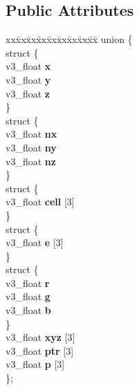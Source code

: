 \subsection*{Public Attributes}
\begin{DoxyCompactItemize}
\item 
\begin{tabbing}
xx\=xx\=xx\=xx\=xx\=xx\=xx\=xx\=xx\=\kill
union \{\\
\>struct \{\\
\>\>v3\_float {\bfseries x}\\
\>\>v3\_float {\bfseries y}\\
\>\>v3\_float {\bfseries z}\\
\>\} \hypertarget{unionns__phys_1_1vector3_1_1_0D0_a8c775ee432466199d998da6c2b31a535}{}\label{unionns__phys_1_1vector3_1_1_0D0_a8c775ee432466199d998da6c2b31a535}
\\
\>struct \{\\
\>\>v3\_float {\bfseries nx}\\
\>\>v3\_float {\bfseries ny}\\
\>\>v3\_float {\bfseries nz}\\
\>\} \hypertarget{unionns__phys_1_1vector3_1_1_0D0_a7e015f7b9566397ade14f5f26af0fdf3}{}\label{unionns__phys_1_1vector3_1_1_0D0_a7e015f7b9566397ade14f5f26af0fdf3}
\\
\>struct \{\\
\>\>v3\_float {\bfseries cell} \mbox{[}3\mbox{]}\\
\>\} \hypertarget{unionns__phys_1_1vector3_1_1_0D0_a36fe0fe4aabc4c4279909d2c72a2977f}{}\label{unionns__phys_1_1vector3_1_1_0D0_a36fe0fe4aabc4c4279909d2c72a2977f}
\\
\>struct \{\\
\>\>v3\_float {\bfseries e} \mbox{[}3\mbox{]}\\
\>\} \hypertarget{unionns__phys_1_1vector3_1_1_0D0_ac22925e2c74a399ef5ca77d625a524ba}{}\label{unionns__phys_1_1vector3_1_1_0D0_ac22925e2c74a399ef5ca77d625a524ba}
\\
\>struct \{\\
\>\>v3\_float {\bfseries r}\\
\>\>v3\_float {\bfseries g}\\
\>\>v3\_float {\bfseries b}\\
\>\} \hypertarget{unionns__phys_1_1vector3_1_1_0D0_ad3b0ce32192493da1ec6c21b34b3c1d6}{}\label{unionns__phys_1_1vector3_1_1_0D0_ad3b0ce32192493da1ec6c21b34b3c1d6}
\\
\>v3\_float {\bfseries xyz} \mbox{[}3\mbox{]}\\
\>v3\_float {\bfseries ptr} \mbox{[}3\mbox{]}\\
\>v3\_float {\bfseries p} \mbox{[}3\mbox{]}\\
\}; \hypertarget{classns__phys_1_1vector3_a83ac2c74246a94c5bd77a35d82881b23}{}\label{classns__phys_1_1vector3_a83ac2c74246a94c5bd77a35d82881b23}
\\

\end{tabbing}\end{DoxyCompactItemize}
